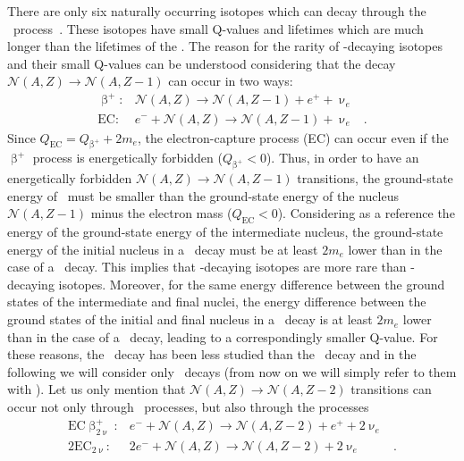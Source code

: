 \blocktitle{$2\upnu\upbeta^+\upbeta^+$}
There are only six naturally occurring isotopes which can decay through the \nnbbp\
process~\cite{Haxton1985}. These isotopes have small Q-values and lifetimes which are much
longer than the lifetimes of the \nnbbm. The reason for the rarity of \nnbbp-decaying
isotopes and their small Q-values can be understood considering that the decay
$\mathcal{N}(A,Z) \rightarrow \mathcal{N}(A,Z-1)$ can occur in two ways:
\[
  \begin{array}{lrl}
    \upbeta^+: &
      \mathcal{N}(A,Z) \rightarrow \mathcal{N}(A,Z-1) + e^+ + \upnu_e & \\
    \text{EC}: &
      e^- + \mathcal{N}(A,Z) \rightarrow \mathcal{N}(A,Z-1) + \upnu_e &.
  \end{array}
\]
Since $Q_\text{EC} = Q_{\upbeta^+}+2m_e$, the electron-capture process (EC) can occur even
if the $\upbeta^+$ process is energetically forbidden ($Q_{\upbeta^+} < 0$). Thus, in
order to have an energetically forbidden $\mathcal{N}(A,Z)\rightarrow\mathcal{N}(A,Z-1)$
transitions, the ground-state energy of \NAZ\ must be smaller than the ground-state energy
of the nucleus $\mathcal{N}(A,Z-1)$ minus the electron mass ($Q_\text{EC}<0$).
Considering as a reference the energy of the ground-state energy of the intermediate
nucleus, the ground-state energy of the initial nucleus in a \nnbbp\ decay must be at
least $2m_e$ lower than in the case of a \nnbbm\ decay. This implies that \nnbbp-decaying
isotopes are more rare than \nnbbm-decaying isotopes. Moreover, for the same energy
difference between the ground states of the intermediate and final nuclei, the energy
difference between the ground states of the initial and final nucleus in a \nnbbp\ decay
is at least $2m_e$ lower than in the case of a \nnbbm\ decay, leading to a correspondingly
smaller Q-value. For these reasons, the \nnbbp\ decay has been less studied than the
\nnbbm\ decay and in the following we will consider only \nnbbm\ decays (from now on we
will simply refer to them with \nnbb). Let us only mention that $\mathcal{N}(A,Z)
\rightarrow \mathcal{N}(A,Z-2)$ transitions can occur not only through \nnbbp\ processes,
but also through the processes
\[
  \begin{array}{lrl}
    \text{EC}\upbeta^+_{2\upnu}: &
      e^- + \mathcal{N}(A,Z) \rightarrow \mathcal{N}(A,Z-2) + e^+ + 2\upnu_e & \\
    2\text{EC}_{2\upnu}: &
      2e^- + \mathcal{N}(A,Z) \rightarrow \mathcal{N}(A,Z-2) + 2\upnu_e &.
  \end{array}
\]

